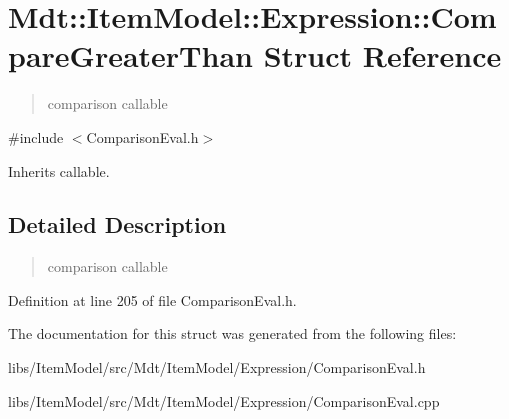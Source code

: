 \hypertarget{struct_mdt_1_1_item_model_1_1_expression_1_1_compare_greater_than}{}\section{Mdt\+:\+:Item\+Model\+:\+:Expression\+:\+:Compare\+Greater\+Than Struct Reference}
\label{struct_mdt_1_1_item_model_1_1_expression_1_1_compare_greater_than}


\begin{quote}
comparison callable \end{quote}
 




{\ttfamily \#include $<$Comparison\+Eval.\+h$>$}



Inherits callable.



\subsection{Detailed Description}
\begin{quote}
comparison callable \end{quote}


Definition at line 205 of file Comparison\+Eval.\+h.



The documentation for this struct was generated from the following files\+:\begin{DoxyCompactItemize}
\item 
libs/\+Item\+Model/src/\+Mdt/\+Item\+Model/\+Expression/Comparison\+Eval.\+h\item 
libs/\+Item\+Model/src/\+Mdt/\+Item\+Model/\+Expression/Comparison\+Eval.\+cpp\end{DoxyCompactItemize}
